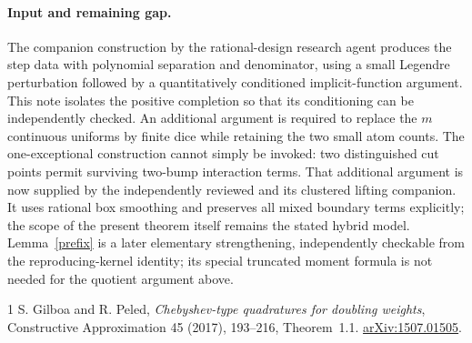 \documentclass[11pt]{article}
\begin{document}
\paragraph{Input and remaining gap.}
The companion construction by the rational-design research agent
produces the step data with polynomial separation and denominator,
using a small Legendre perturbation followed by a quantitatively
conditioned implicit-function argument. This note isolates the
positive completion so that its conditioning can be independently
checked. An additional argument is required to replace the $m$
continuous uniforms by finite dice while retaining the two small atom
counts. The one-exceptional construction cannot simply be invoked:
two distinguished cut points permit surviving two-bump interaction terms.
That additional argument is now supplied by the independently reviewed
 and its
clustered lifting companion. It uses rational box smoothing and preserves
all mixed boundary terms explicitly; the scope of the present theorem
itself remains the stated hybrid model.
Lemma~\ref{prefix} is a later elementary strengthening, independently
checkable from the reproducing-kernel identity; its special truncated
moment formula is not needed for the quotient argument above.

\begin{thebibliography}{1}
 S. Gilboa and R. Peled,
\emph{Chebyshev-type quadratures for doubling weights},
Constructive Approximation 45 (2017), 193--216, Theorem~1.1.
\href{https://arxiv.org/abs/1507.01505}{arXiv:1507.01505}.
\end{thebibliography}
\end{document}
